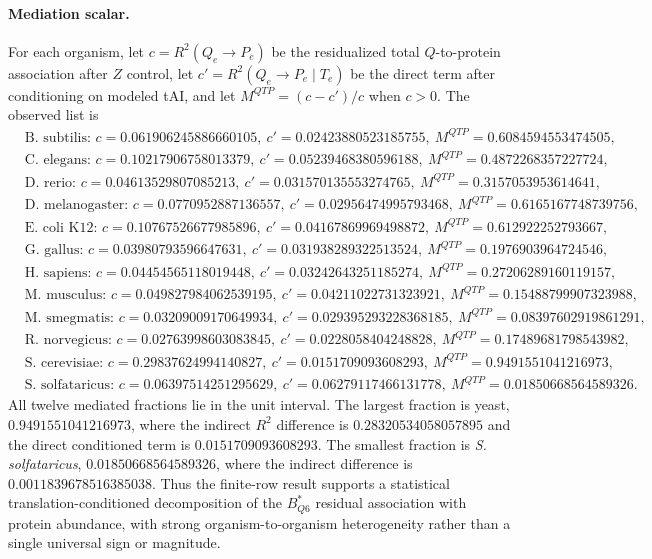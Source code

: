 \paragraph{Mediation scalar.}
For each organism, let $c=R^2(Q_e\to P_e)$ be the residualized total $Q$-to-protein association after $Z$ control, let $c'=R^2(Q_e\to P_e\mid T_e)$ be the direct term after conditioning on modeled tAI, and let $M^{QTP}=(c-c')/c$ when $c>0$.  The observed list is
$$
\begin{aligned}
&\text{B. subtilis: } c=0.061906245886660105,\ c'=0.02423880523185755,\ M^{QTP}=0.6084594553474505,\\
&\text{C. elegans: } c=0.10217906758013379,\ c'=0.05239468380596188,\ M^{QTP}=0.4872268357227724,\\
&\text{D. rerio: } c=0.04613529807085213,\ c'=0.031570135553274765,\ M^{QTP}=0.3157053953614641,\\
&\text{D. melanogaster: } c=0.0770952887136557,\ c'=0.02956474995793468,\ M^{QTP}=0.6165167748739756,\\
&\text{E. coli K12: } c=0.10767526677985896,\ c'=0.04167869969498872,\ M^{QTP}=0.612922252793667,\\
&\text{G. gallus: } c=0.03980793596647631,\ c'=0.031938289322513524,\ M^{QTP}=0.1976903964724546,\\
&\text{H. sapiens: } c=0.04454565118019448,\ c'=0.03242643251185274,\ M^{QTP}=0.27206289160119157,\\
&\text{M. musculus: } c=0.049827984062539195,\ c'=0.04211022731323921,\ M^{QTP}=0.15488799907323988,\\
&\text{M. smegmatis: } c=0.03209009170649934,\ c'=0.029395293228368185,\ M^{QTP}=0.08397602919861291,\\
&\text{R. norvegicus: } c=0.02763998603083845,\ c'=0.0228058404248828,\ M^{QTP}=0.17489681798543982,\\
&\text{S. cerevisiae: } c=0.29837624994140827,\ c'=0.0151709093608293,\ M^{QTP}=0.9491551041216973,\\
&\text{S. solfataricus: } c=0.06397514251295629,\ c'=0.06279117466131778,\ M^{QTP}=0.01850668564589326.
\end{aligned}
$$
All twelve mediated fractions lie in the unit interval.  The largest fraction is yeast, $0.9491551041216973$, where the indirect $R^2$ difference is $0.28320534058057895$ and the direct conditioned term is $0.0151709093608293$.  The smallest fraction is \emph{S. solfataricus}, $0.01850668564589326$, where the indirect difference is $0.0011839678516385038$.  Thus the finite-row result supports a statistical translation-conditioned decomposition of the $B^{\ast}_{Q6}$ residual association with protein abundance, with strong organism-to-organism heterogeneity rather than a single universal sign or magnitude.

